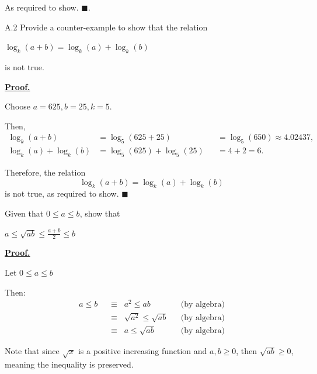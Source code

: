 \documentclass[]{article}
\begin{document}
As required to show. $\blacksquare$.

\begin{question}{A.2}
    Provide a counter-example to show that the relation
    \begin{center}
        $\log_k{(a+b)} = \log_k(a) + \log_k(b)$
    \end{center}
    is not true.
\end{question}

\underline{\textbf{Proof.}}  

Choose $a = 625, b = 25, k = 5$.

Then, 
\begin{align*}
    \log_k(a+b) &= \log_5(625 + 25) &&= \log_5(650) \approx 4.02437,\\
    \log_k(a) + \log_k(b) &= \log_5(625) + \log_5(25) &&= 4 + 2 = 6.
\end{align*}

Therefore, the relation
\[
\log_k(a+b) = \log_k(a) + \log_k(b)
\]
is not true, as required to show. $\blacksquare$

\begin{question}{2}
    Given that $0 \le a \le b$, show that
    \begin{center}
        $a \le \sqrt{ab} \le \frac{a+b}{2} \le b$
    \end{center}
\end{question}

\underline{\textbf{Proof.}}  

Let $0 \le a \le b$

Then: 
\begin{align*}
    a \le b
    &\;\;\equiv\;\; a^2 \le ab 
    && \text{(by algebra)} \\[6pt]
    &\;\;\equiv\;\; \sqrt{a^2} \le \sqrt{ab}
    && \text{(by algebra)} \\[6pt]
    &\;\;\equiv\;\; a \le \sqrt{ab} 
    && \text{(by algebra)}
\end{align*}

Note that since $\sqrt{x}$ is a positive increasing function and $a, b \ge 0$, then $\sqrt{ab} \ge 0$, meaning the inequality is preserved.
\end{document}
